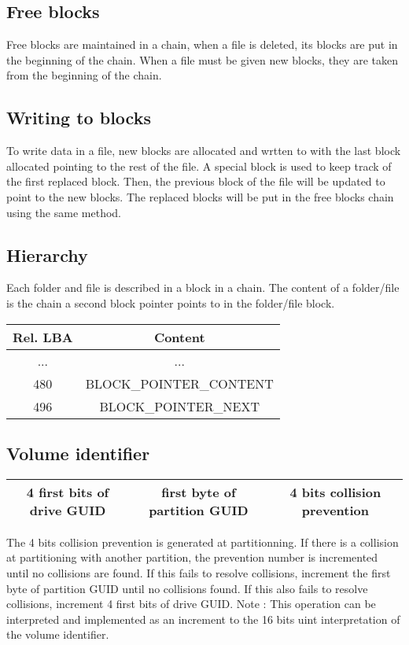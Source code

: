 \documentclass{article}
\begin{document}
\subsection{Free blocks}
Free blocks are maintained in a chain, when a file is deleted, its blocks are put in the beginning of the chain. When a file must be given new blocks, they are taken from the beginning of the chain.
\subsection{Writing to blocks} 
To write data in a file, new blocks are allocated and wrtten to with the last block allocated pointing to the rest of the file. A special block is used to keep track of the first replaced block.
Then, the previous block of the file will be updated to point to the new blocks.
The replaced blocks will be put in the free blocks chain using the same method.

\subsection{Hierarchy}
Each folder and file is described in a block in a chain. The content of a folder/file is the chain a second block pointer points to in the folder/file block.
\newline
\begin{tabular}{|c|c|}
  \hline
  Rel. LBA & Content \\
  \hline
  ... & ...  \\
  \hline
  480 & BLOCK\_POINTER\_CONTENT \\
  \hline
  496 & BLOCK\_POINTER\_NEXT \\
  \hline
\end{tabular}

\subsection{Volume identifier}

\begin{tabular}{|c|c|c|}
  \hline
  4 first bits of drive GUID & first byte of partition GUID & 4 bits collision prevention \\
  \hline
\end{tabular}
\newline
The 4 bits collision prevention is generated at partitionning. If there is a collision at partitioning with another partition, the prevention number is incremented until no collisions are found. If this fails to resolve collisions, increment the first byte of partition GUID until no collisions found. If this also fails to resolve collisions, increment 4 first bits of drive GUID.
\newline
Note : This operation can be interpreted and implemented as an increment to the 16 bits uint interpretation of the volume identifier.
\end{document}
